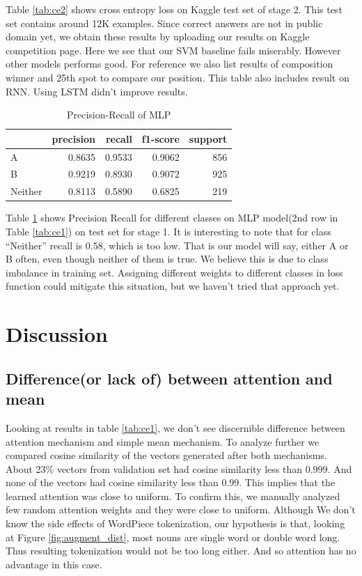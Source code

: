 \documentclass[11pt,a4paper]{article}
\begin{document}
Table \ref{tab:ce2} shows cross entropy loss on Kaggle test set of stage 2. This test set contains around 12K examples. Since correct answers are not in public domain yet, we obtain these results by uploading our results on Kaggle competition page. Here we see that our SVM baseline fails miserably. However other models performs good. For reference we also list results of composition winner and 25th spot to compare our position. This table also includes result on RNN. Using LSTM didn't improve results.

\begin{table}
  \centering
  \begin{tabular}{|l|r|r|r|r|}
    \hline
    &    precision&    recall&  f1-score&    support \\
    \hline
    A&     0.8635&    0.9533&    0.9062&       856\\
    B&     0.9219&    0.8930&    0.9072&       925\\
    Neither&     0.8113&    0.5890&    0.6825&       219\\
    \hline

  \end{tabular}
  \caption{Precision-Recall of MLP}
  \label{tab:precisionrecall}
\end{table}

Table \ref{tab:precisionrecall} shows Precision Recall for different classes on MLP model(2nd row in Table \ref{tab:ce1}) on test set for stage 1. It is interesting to note that for class ``Neither'' recall is 0.58, which is too low. That is our model will say, either A or B often, even though neither of them is true. We believe this is due to class imbalance in training set. Assigning different weights to different classes in loss function could mitigate this situation, but we haven't tried that approach yet.

\section{Discussion}
\label{sec:discussion}

\subsection{Difference(or lack of) between attention and mean}
Looking at results in table \ref{tab:ce1}, we don't see discernible difference between attention mechanism and simple mean mechanism. To analyze further we compared cosine similarity of the vectors generated after both mechanisms. About 23\% vectors from validation set had cosine similarity less than $0.999$. And none of the vectors had cosine similarity less than $0.99$. This implies that the learned attention was close to uniform. To confirm this,  we manually analyzed few random attention weights and they were close to uniform. Although We don't know the side effects of WordPiece tokenization, our hypothesis is that, looking at Figure \ref{fig:augment_dist}, most nouns are single word or double word long. Thus resulting tokenization would not be too long either. And so attention has no advantage in this case.
\end{document}
